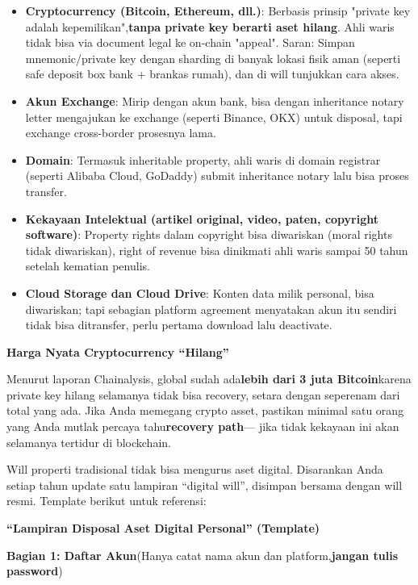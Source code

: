 \begin{itemize}
  \item \textbf{Cryptocurrency (Bitcoin, Ethereum, dll.)}: Berbasis prinsip "private key adalah kepemilikan",\textbf{tanpa private key berarti aset hilang}. Ahli waris tidak bisa via document legal ke on-chain "appeal". Saran: Simpan mnemonic/private key dengan sharding di banyak lokasi fisik aman (seperti safe deposit box bank + brankas rumah), dan di will tunjukkan cara akses.
  \item \textbf{Akun Exchange}: Mirip dengan akun bank, bisa dengan inheritance notary letter mengajukan ke exchange (seperti Binance, OKX) untuk disposal, tapi exchange cross-border prosesnya lama.
  \item \textbf{Domain}: Termasuk inheritable property, ahli waris di domain registrar (seperti Alibaba Cloud, GoDaddy) submit inheritance notary lalu bisa proses transfer.
  \item \textbf{Kekayaan Intelektual (artikel original, video, paten, copyright software)}: Property rights dalam copyright bisa diwariskan (moral rights tidak diwariskan), right of revenue bisa dinikmati ahli waris sampai 50 tahun setelah kematian penulis.
  \item \textbf{Cloud Storage dan Cloud Drive}: Konten data milik personal, bisa diwariskan; tapi sebagian platform agreement menyatakan akun itu sendiri tidak bisa ditransfer, perlu pertama download lalu deactivate.
\end{itemize}

\textbf{Harga Nyata Cryptocurrency “Hilang”}\par

Menurut laporan Chainalysis, global sudah ada\textbf{lebih dari 3 juta Bitcoin}karena private key hilang selamanya tidak bisa recovery, setara dengan seperenam dari total yang ada. Jika Anda memegang crypto asset, pastikan minimal satu orang yang Anda mutlak percaya tahu\textbf{recovery path}— jika tidak kekayaan ini akan selamanya tertidur di blockchain.


Will properti tradisional tidak bisa mengurus aset digital. Disarankan Anda setiap tahun update satu lampiran “digital will”, disimpan bersama dengan will resmi. Template berikut untuk referensi:

\textbf{“Lampiran Disposal Aset Digital Personal” (Template)}\par

\textbf{Bagian 1: Daftar Akun}(Hanya catat nama akun dan platform,\textbf{jangan tulis password})

